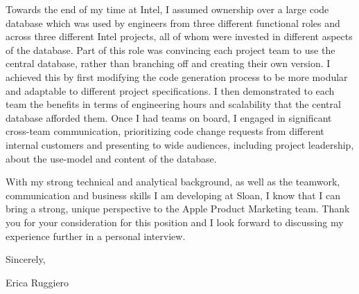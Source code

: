 \documentclass[a4paper,11pt,letter]{business}
\begin{document}
Towards the end of my time at Intel, I assumed ownership over a large code database which was used by engineers from three different functional roles and across three different Intel projects, all of whom were invested in different aspects of the database.
Part of this role was convincing each project team to use the central database, rather than branching off and creating their own version.
I achieved this by first modifying the code generation process to be more modular and adaptable to different project specifications.
I then demonstrated to each team the benefits in terms of engineering hours and scalability that the central database afforded them.
Once I had teams on board, I engaged in significant cross-team communication, prioritizing code change requests from different internal customers and presenting to wide audiences, including project leadership, about the use-model and content of the database.


With my strong technical and analytical background, as well as the teamwork, communication and business skills I am developing at Sloan, I know that I can bring a strong, unique perspective to the Apple Product Marketing team.
Thank you for your consideration for this position and I look forward to discussing my experience further in a personal interview.


Sincerely,

Erica Ruggiero
\end{document}
